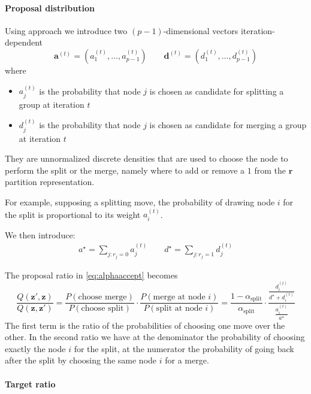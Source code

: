 \paragraph{Proposal distribution}\label{par:proposalratio}

Using \textcite{bensonAdaptiveMCMCMultiple2018} approach we introduce two $( p-1)$-dimensional vectors iteration-dependent
\begin{equation*}
\mathbf{a}^{( t)} =( a_{1}^{( t)} ,\dotsc ,a_{p-1}^{( t)}) \qquad \mathbf{d}^{( t)} =( d_{1}^{( t)} ,\dotsc ,d_{p-1}^{( t)})
\end{equation*}
where
\begin{itemize}
\item $a_{j}^{( t)}$ is the probability that node $j$ is chosen as candidate for splitting a group at iteration $t$
\item $d_{j}^{( t)}$ is the probability that node $j$ is chosen as candidate for merging a group at iteration $t$
\end{itemize}
They are unnormalized discrete densities that are used to choose the node to perform the split or the merge, namely where to add or remove a $1$ from the $\bm{r}$ partition representation.

For example, supposing a splitting move, the probability of drawing node $i$ for the split is proportional to its weight $a_{i}^{(t)}$.

We then introduce:
\begin{align*}
    a^{\star} = \sum\nolimits_{j:r_j=0}{a_{j}^{(t)}} \qquad d^{\star} = \sum\nolimits_{j:r_j=1}{d_{j}^{(t)}}
\end{align*}

The proposal ratio in \eqref{eq:alphaaccept} becomes
\[
    \frac{Q(\bm{z}',\bm{z})}{Q(\bm{z},\bm{z}')}
    =
    \frac{P(\text{choose merge})}{P(\text{choose split})}
    \cdot 
    \frac{P(\text{merge at node $i$})}{P(\text{split at node $i$})}
    =
    \frac{1-\alpha_{\text{split}}}{\alpha_{\text{split}}}
    \cdot
    \frac{\frac{d_{i}^{(t)}}{d^{\star}+d_{i}^{(t)}}}{\frac{a_{i}^{(t)}}{a^{\star}}}
\]
The first term is the ratio of the probabilities of choosing one move over the other. In the second ratio we have at the denominator the probability of choosing exactly the node $i$ for the split, at the numerator the probability of going back after the split  by choosing the same node $i$ for a merge.

\paragraph{Target ratio}

